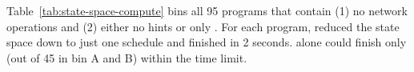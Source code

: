 

Table~\ref{tab:state-space-compute} bins all 95 programs that contain
(1) no network operations and (2) either no hints or only \computes. For each program,
\ecosys reduced the state space down to just one
schedule and finished in 2 seconds. \dbug alone could finish only
\nprogverifieddbug (out of 45 in bin A and B) within the time limit.

